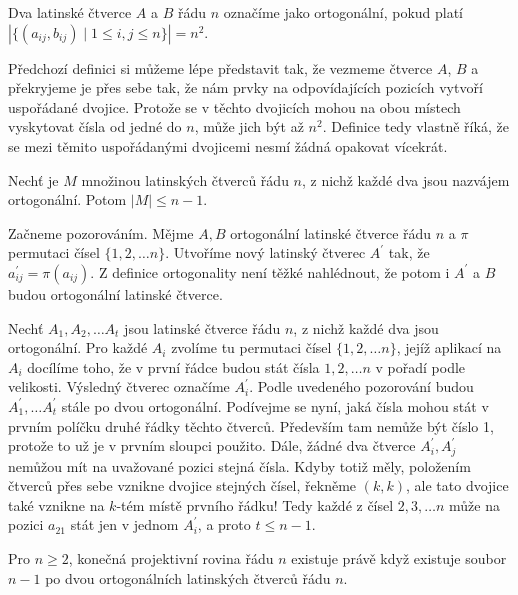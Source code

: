 \begin{t_definition}
  Dva latinské čtverce $A$ a $B$ řádu $n$ označíme jako ortogonální, pokud platí
  $|\{(a_{ij},b_{ij})\mid 1\leq i,j \leq n\}|=n^2$.
\end{t_definition}

\begin{t_remark}
  Předchozí definici si můžeme lépe představit tak, že vezmeme čtverce $A$, $B$ a překryjeme je přes sebe tak, že nám prvky na odpovídajících pozicích vytvoří uspořádané dvojice. Protože se v těchto dvojicích mohou na obou místech vyskytovat čísla od jedné do $n$, může jich být až $n^2$. Definice tedy vlastně říká, že se mezi těmito uspořádanými dvojicemi nesmí žádná opakovat vícekrát.
\end{t_remark}

\begin{t_theorem}
  Nechť je $M$ množinou latinských čtverců řádu $n$, z nichž každé dva jsou nazvájem ortogonální. Potom $|M|\leq n-1$.
\end{t_theorem}

\begin{t_proof}
  Začneme pozorováním. Mějme $A, B$ ortogonální latinské čtverce řádu $n$ a $\pi$ permutaci čísel $\{1, 2,\dots n\}$. Utvoříme nový latinský čtverec $A^\prime$ tak, že $a^\prime_{ij}=\pi(a_{ij})$. Z definice ortogonality není těžké nahlédnout, že potom i $A^\prime$ a $B$ budou ortogonální latinské čtverce.
  
  Nechť $A_1,A_2,\dots A_t$ jsou latinské čtverce řádu $n$, z nichž každé dva jsou ortogonální. Pro každé $A_i$ zvolíme tu permutaci čísel $\{1,2,\dots n\}$, jejíž aplikací na $A_i$ docílíme toho, že v první řádce budou stát čísla $1,2,\dots n$ v pořadí podle velikosti. Výsledný čtverec označíme $A^\prime_i$. Podle uvedeného pozorování budou $A^\prime_1,\dots A^\prime_t$ stále po dvou ortogonální. Podívejme se nyní, jaká čísla mohou stát v prvním políčku druhé řádky těchto čtverců. Především tam nemůže být číslo 1, protože to už je v prvním sloupci použito. Dále, žádné dva čtverce $A^\prime_i, A^\prime_j$ nemůžou mít na uvažované pozici stejná čísla. Kdyby totiž měly, položením čtverců přes sebe vznikne dvojice stejných čísel, řekněme $(k,k)$, ale tato dvojice také vznikne na $k$-tém místě prvního řádku! Tedy každé z čísel $2,3,\dots n$ může na pozici $a_{21}$ stát jen v jednom $A^\prime_i$, a proto $t\leq n-1$.
\end{t_proof}

\begin{t_theorem}
  Pro $n\geq 2$, konečná projektivní rovina řádu $n$ existuje právě když existuje soubor $n-1$ po dvou ortogonálních latinských čtverců řádu $n$.
\end{t_theorem}

